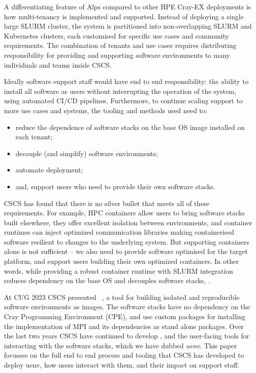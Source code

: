 A differentiating feature of Alps compared to other HPE Cray-EX deployments is how multi-tenancy is implemented and supported.
Instead of deploying a single large SLURM cluster, the system is partitioned into non-overlapping SLURM and Kubernetes clusters, each customised for specific use cases and community requirements.
The combination of tenants and use cases requires distributing responsibility for providing and supporting software environments to many individuals and teams inside CSCS.

Ideally software support staff would have end to end responsibility: the ability to install all software as users without interrupting the operation of the system, using automated CI/CD pipelines.
Furthermore, to continue scaling support to more use cases and systems, the tooling and methods used need to:
\begin{itemize}
    \item reduce the dependence of software stacks on the base OS image installed on each tenant;
    \item decouple (and simplify) software environments;
    \item automate deployment;
    \item and, support users who need to provide their own software stacks.
\end{itemize}

CSCS has found that there is no silver bullet that meets all of these requirements.
For example, HPC containers allow users to bring software stacks built elsewhere, they offer excellent isolation between environments, and container runtimes can inject optimized communication libraries making containerised software resilient to changes to the underlying system.
But supporting containers alone is not sufficient -- we also need to provide software optimised for the target platform, and support users building their own optimized containers.
In other words, while providing a robust container runtime with SLURM integration reduces dependency on the base OS and decouples software stacks, .

At CUG 2023 CSCS presented \stackinator~\cite{uenv2023}, a tool for building isolated and reproducible software environments as \squashfs images.
The software stacks have no dependency on the Cray Programming Environment (CPE), and use custom \spack packages for installing the \craympich implementation of MPI and its dependencies as stand alone packages.
Over the last two years CSCS have continued to develop \stackinator, and the user-facing tools for interacting with the software stacks, which we have dubbed \emph{uenv}.
This paper focusses on the full end to end process and tooling that CSCS has developed to deploy uenv, how users interact with them, and their impact on support staff.

